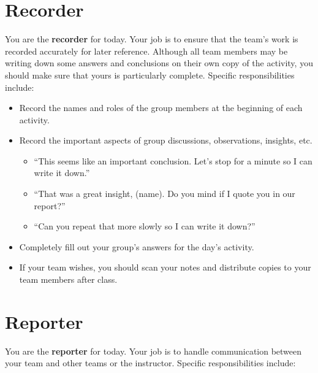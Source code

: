 \documentclass[12pt]{article}
\begin{document}
\newpage
\section*{Recorder}

You are the \textbf{recorder} for today. Your job is to ensure that
the team's work is recorded accurately for later reference. Although
all team members may be writing down some answers and conclusions on
their own copy of the activity, you should make sure that yours is
particularly complete.  Specific responsibilities include:

\begin{itemize}
\item Record the names and roles of the group members at the
  beginning of each activity.
\item Record the important aspects of group discussions, observations,
  insights, etc.
  \begin{itemize}
  \item ``This seems like an important conclusion. Let's stop
    for a minute so I can write it down.''
  \item ``That was a great insight, (name). Do you mind if I quote you
    in our report?''
  \item ``Can you repeat that more slowly so I can write it down?''
  \end{itemize}
\item Completely fill out your group's answers for the day's activity.
\item If your team wishes, you should scan your notes and distribute
  copies to your team members after class.
\end{itemize}
\newpage
\section*{Reporter}

You are the \textbf{reporter} for today.  Your job is to handle
communication between your team and other teams or the instructor.
Specific responsibilities include:
\end{document}
